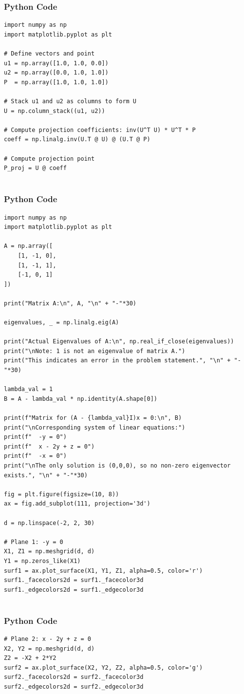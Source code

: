 \documentclass{beamer}
\begin{document}
\begin{frame}[fragile]
    \frametitle{Python Code}
    \begin{lstlisting}
import numpy as np
import matplotlib.pyplot as plt

# Define vectors and point
u1 = np.array([1.0, 1.0, 0.0])
u2 = np.array([0.0, 1.0, 1.0])
P  = np.array([1.0, 1.0, 1.0])

# Stack u1 and u2 as columns to form U
U = np.column_stack((u1, u2))

# Compute projection coefficients: inv(U^T U) * U^T * P
coeff = np.linalg.inv(U.T @ U) @ (U.T @ P)

# Compute projection point
P_proj = U @ coeff


    \end{lstlisting}
\end{frame}
\begin{frame}[fragile]
    \frametitle{Python Code}
    \begin{lstlisting}
import numpy as np
import matplotlib.pyplot as plt

A = np.array([
    [1, -1, 0],
    [1, -1, 1],
    [-1, 0, 1]
])

print("Matrix A:\n", A, "\n" + "-"*30)

eigenvalues, _ = np.linalg.eig(A)

print("Actual Eigenvalues of A:\n", np.real_if_close(eigenvalues))
print("\nNote: 1 is not an eigenvalue of matrix A.")
print("This indicates an error in the problem statement.", "\n" + "-"*30)

lambda_val = 1
B = A - lambda_val * np.identity(A.shape[0])

print(f"Matrix for (A - {lambda_val}I)x = 0:\n", B)
print("\nCorresponding system of linear equations:")
print(f"  -y = 0")
print(f"  x - 2y + z = 0")
print(f"  -x = 0")
print("\nThe only solution is (0,0,0), so no non-zero eigenvector exists.", "\n" + "-"*30)

fig = plt.figure(figsize=(10, 8))
ax = fig.add_subplot(111, projection='3d')

d = np.linspace(-2, 2, 30)

# Plane 1: -y = 0
X1, Z1 = np.meshgrid(d, d)
Y1 = np.zeros_like(X1)
surf1 = ax.plot_surface(X1, Y1, Z1, alpha=0.5, color='r')
surf1._facecolors2d = surf1._facecolor3d
surf1._edgecolors2d = surf1._edgecolor3d


    \end{lstlisting}
\end{frame}
\begin{frame}[fragile]
    \frametitle{Python Code}
    \begin{lstlisting}
# Plane 2: x - 2y + z = 0
X2, Y2 = np.meshgrid(d, d)
Z2 = -X2 + 2*Y2
surf2 = ax.plot_surface(X2, Y2, Z2, alpha=0.5, color='g')
surf2._facecolors2d = surf2._facecolor3d
surf2._edgecolors2d = surf2._edgecolor3d





    \end{lstlisting}
\end{frame}
\end{document}
